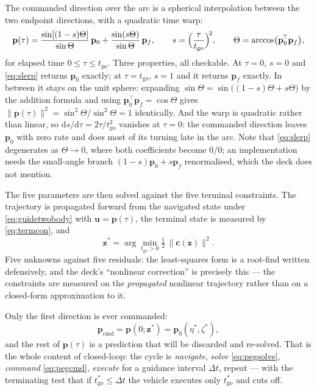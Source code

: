 \documentclass[11pt]{article}
\newcommand{\dd}{\mathrm{d}}
\begin{document}
The commanded direction over the arc is a spherical interpolation between the
two endpoint directions, with a quadratic time warp:
\begin{equation}
  \mathbf{p}(\tau) =
    \frac{\sin[(1-s)\Theta]}{\sin\Theta}\,\mathbf{p}_0
  + \frac{\sin(s\Theta)}{\sin\Theta}\,\mathbf{p}_f ,
  \qquad
  s = \Bigl(\frac{\tau}{t_{\text{go}}}\Bigr)^{\!2},
  \qquad
  \Theta = \arccos\bigl(\mathbf{p}_0^{\!\top}\mathbf{p}_f\bigr),
  \label{eq:slerp}
\end{equation}
for elapsed time $0\le\tau\le t_{\text{go}}$. Three properties, all checkable.
At $\tau=0$, $s=0$ and \eqref{eq:slerp} returns $\mathbf{p}_0$ exactly; at
$\tau=t_{\text{go}}$, $s=1$ and it returns $\mathbf{p}_f$ exactly. In between
it stays on the unit sphere: expanding
$\sin\Theta = \sin\bigl((1-s)\Theta + s\Theta\bigr)$ by the addition formula
and using $\mathbf{p}_0^{\!\top}\mathbf{p}_f = \cos\Theta$ gives
$\|\mathbf{p}(\tau)\|^2 = \sin^2\Theta/\sin^2\Theta = 1$ identically. And the
warp is quadratic rather than linear, so $\dd s/\dd\tau = 2\tau/t_{\text{go}}^2$
vanishes at $\tau=0$: the commanded direction leaves $\mathbf{p}_0$ with zero
rate and does most of its turning late in the arc. Note that
\eqref{eq:slerp} degenerates as $\Theta\to 0$, where both coefficients become
$0/0$; an implementation needs the small-angle branch $(1-s)\mathbf{p}_0 +
s\mathbf{p}_f$ renormalised, which the deck does not mention.

The five parameters are then solved against the five terminal constraints. The
trajectory is propagated forward from the navigated state under
\eqref{eq:guidetwobody} with $\mathbf{u} = \mathbf{p}(\tau)$, the terminal
state is measured by \eqref{eq:termcon}, and
\begin{equation}
  \mathbf{z}^{*} = \arg\min_{t_{\text{go}}>0}
                   \tfrac{1}{2}\,\|\mathbf{c}(\mathbf{z})\|^2 .
  \label{eq:pegsolve}
\end{equation}
Five unknowns against five residuals: the least-squares form is a root-find
written defensively, and the deck's ``nonlinear correction'' is precisely this
--- the constraints are measured on the \emph{propagated} nonlinear trajectory
rather than on a closed-form approximation to it.

Only the first direction is ever commanded:
\begin{equation}
  \mathbf{p}_{\text{cmd}} = \mathbf{p}(0;\mathbf{z}^{*})
                          = \mathbf{p}_0(\eta^{*},\zeta^{*}) ,
  \label{eq:pegcmd}
\end{equation}
and the rest of $\mathbf{p}(\tau)$ is a prediction that will be discarded and
re-solved. That is the whole content of closed-loop: the cycle is
\emph{navigate}, \emph{solve} \eqref{eq:pegsolve}, \emph{command}
\eqref{eq:pegcmd}, \emph{execute} for a guidance interval $\Delta t$, repeat
--- with the terminating test that if $t_{\text{go}}^{*} \le \Delta t$ the
vehicle executes only $t_{\text{go}}^{*}$ and cuts off.
\end{document}
